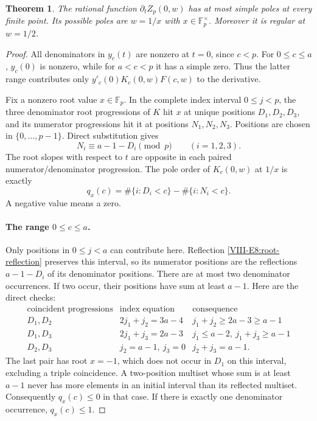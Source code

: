 \documentclass[11pt,letterpaper]{article}
\newtheorem{theorem}{Theorem}[section]
\numberwithin{equation}{section}
\begin{document}
\begin{theorem}\label{VIII-E8:simple-poles}
The rational function $\partial_tZ_p(0,w)$ has at most simple poles
at every finite point. Its possible poles are $w=1/x$ with
$x\in\mathbb F_p^\times$. Moreover it is regular at $w=1/2$.
\end{theorem}
\begin{proof}
All denominators in $y_c(t)$ are nonzero at $t=0$, since $c<p$.
For $0\le c\le a$, $y_c(0)$ is nonzero, while for $a<c<p$ it has a
simple zero. Thus the latter range contributes only
$y'_c(0)K_c(0,w)F(c,w)$ to the derivative.

Fix a nonzero root value $x\in\mathbb F_p$. In the complete index
interval $0\le j<p$, the three denominator root progressions of $K$
hit $x$ at unique positions $D_1,D_2,D_3$, and its numerator
progressions hit it at positions $N_1,N_2,N_3$. Positions are chosen
in $\{0,\ldots,p-1\}$. Direct substitution gives
\begin{equation}\label{VIII-E8:root-reflection}
 N_i\equiv a-1-D_i\pmod p \qquad(i=1,2,3).
\end{equation}
The root slopes with respect to $t$ are opposite in each paired
numerator/denominator progression.
The pole order of $K_c(0,w)$ at $1/x$ is exactly
\[
 q_x(c)=\#\{i:D_i<c\}-\#\{i:N_i<c\}.
\]
A negative value means a zero.

\paragraph{The range $0\le c\le a$.}
Only positions in $0\le j<a$ can contribute here. Reflection
\eqref{VIII-E8:root-reflection} preserves this interval, so its numerator
positions are the reflections $a-1-D_i$ of its denominator positions.
There are at most two denominator occurrences. If two occur, their
positions have sum at least $a-1$. Here are the direct checks:
\[
\begin{array}{c|c|c}
\text{coincident progressions}&\text{index equation}&\text{consequence}\\\hline
D_1,D_2&2j_1+j_2=3a-4&j_1+j_2\ge2a-3\ge a-1\\
D_1,D_3&2j_1+j_3=2a-3&j_1\le a-2,\ j_1+j_3\ge a-1\\
D_2,D_3&j_2=a-1,\ j_3=0&j_2+j_3=a-1.
\end{array}
\]
The last pair has root $x=-1$, which does not occur in $D_1$ on this
interval, excluding a triple coincidence. A two-position multiset
whose sum is at least $a-1$ never has more elements in an initial
interval than its reflected multiset. Consequently $q_x(c)\le0$
in that case. If there is exactly one denominator occurrence,
$q_x(c)\le1$.


\end{proof}
\end{document}
